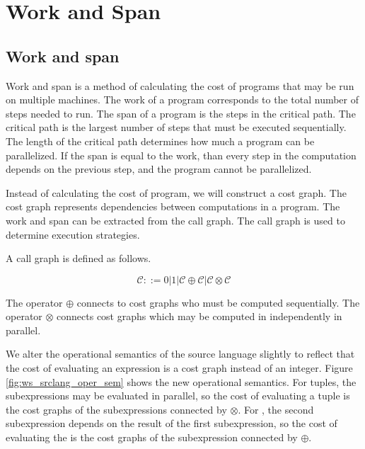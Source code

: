 \chapter{Work and Span}

\section{Work and span}
Work and span is a method of calculating the cost of programs that may be run on multiple machines.
The work of a program corresponds to the total number of steps needed to run.
The span of a program is the steps in the critical path.
The critical path is the largest number of steps that must be executed sequentially.
The length of the critical path determines how much a program can be parallelized.
If the span is equal to the work, than every step in the computation depends on the previous step, and the program cannot be parallelized.

Instead of calculating the cost of program, we will construct a cost graph.
The cost graph represents dependencies between computations in a program.
The work and span can be extracted from the call graph.
The call graph is used to determine execution strategies.

A call graph is defined as follows.

\[ \mathcal{C} ::= 0 | 1 | \mathcal{C} \oplus \mathcal{C} | \mathcal{C} \otimes \mathcal{C} \]

The operator $\oplus$ connects to cost graphs who must be computed sequentially.
The operator $\otimes$ connects cost graphs which may be computed in independently in parallel.

We alter the operational semantics of the source language slightly to reflect that the cost of evaluating an expression is a cost graph instead of an integer.
Figure \ref{fig:ws_srclang_oper_sem} shows the new operational semantics.
For tuples, the subexpressions may be evaluated in parallel, so the cost of evaluating a tuple is the cost graphs of the subexpressions connected by $\otimes$.
For , the second subexpression depends on the result of the first subexpression, so the cost of evaluating the  is the cost graphs of the subexpression connected by $\oplus$.


